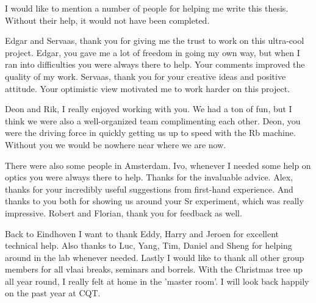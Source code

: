 \noindent I would like to mention a number of people for helping me write this thesis. 
Without their help, it would not have been completed.

Edgar and Servaas, thank you for giving me the trust to work on this ultra-cool project. 
Edgar, you gave me a lot of freedom in going my own way, but when I ran into difficulties you were always there to help. 
Your comments improved the quality of my work. 
Servaas, thank you for your creative ideas and positive attitude. 
Your optimistic view motivated me to work harder on this project. 

Deon and Rik, I really enjoyed working with you.
We had a ton of fun, but I think we were also a well-organized team complimenting each other.
Deon, you were the driving force in quickly getting us up to speed with the Rb machine.
Without you we would be nowhere near where we are now.

There were also some people in Amsterdam.
Ivo, whenever I needed some help on optics you were always there to help. 
Thanks for the invaluable advice. 
Alex, thanks for your incredibly useful suggestions from first-hand experience. 
And thanks to you both for showing us around your Sr experiment, which was really impressive.
Robert and Florian, thank you for feedback as well.

Back to Eindhoven I want to thank Eddy, Harry and Jeroen for excellent technical help. 
Also thanks to Luc, Yang, Tim, Daniel and Sheng for helping around in the lab whenever needed.
Lastly I would like to thank all other group members for all vlaai breaks, seminars and borrels. 
With the Christmas tree up all year round, I really felt at home in the 'master room'. 
I will look back happily on the past year at CQT. 
